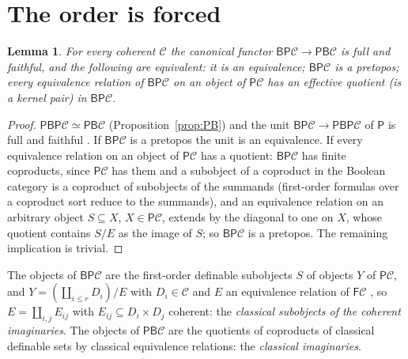 \documentclass[11pt]{amsart}
\newtheorem{lem}[thm]{Lemma}
\theoremstyle{definition}
\newcommand{\FF}{\mathsf F}
\newcommand{\PP}{\mathsf P}
\newcommand{\BB}{\mathsf B}
\newcommand{\cC}{\mathcal C}
\begin{document}
\section{The order is forced}\label{sec:order}

\begin{lem}\label{lem:full}
For every coherent $\cC$ the canonical functor $\BB\PP\cC\to\PP\BB\cC$ is
full and faithful, and the following are equivalent: it is an
equivalence; $\BB\PP\cC$ is a pretopos; every equivalence relation of
$\BB\PP\cC$ on an object of $\PP\cC$ has an effective quotient (is a
kernel pair) in $\BB\PP\cC$.
\end{lem}
\begin{proof}
$\PP\BB\PP\cC\simeq\PP\BB\cC$ (Proposition~\ref{prop:PB}) and the unit
$\BB\PP\cC\to\PP\BB\PP\cC$ of $\PP$ is full and faithful
\cite[A3.3]{Elephant}. If $\BB\PP\cC$ is a pretopos the unit is an
equivalence. If every equivalence relation on an object of $\PP\cC$ has a
quotient: $\BB\PP\cC$ has finite coproducts, since $\PP\cC$ has them and a
subobject of a coproduct in the Boolean category is a coproduct of
subobjects of the summands (first-order formulas over a coproduct sort
reduce to the summands), and an equivalence relation on an arbitrary
object $S\subseteq X$, $X\in\PP\cC$, extends by the diagonal to one on
$X$, whose quotient contains $S/E$ as the image of $S$; so $\BB\PP\cC$ is
a pretopos. The remaining implication is trivial.
\end{proof}

The objects of $\BB\PP\cC$ are the first-order definable subobjects $S$
of objects $Y$ of $\PP\cC$, and $Y=(\coprod_{i\le r}D_i)/E$ with
$D_i\in\cC$ and $E$ an equivalence relation of $\FF\cC$
\cite[Thm.~4.4]{TheoryComp}, so $E=\coprod_{i,j}E_{ij}$ with $E_{ij}
\subseteq D_i\times D_j$ coherent: the \emph{classical subobjects of the
coherent imaginaries}. The objects of $\PP\BB\cC$ are the quotients of
coproducts of classical definable sets by classical equivalence
relations: the \emph{classical imaginaries}.
\end{document}
